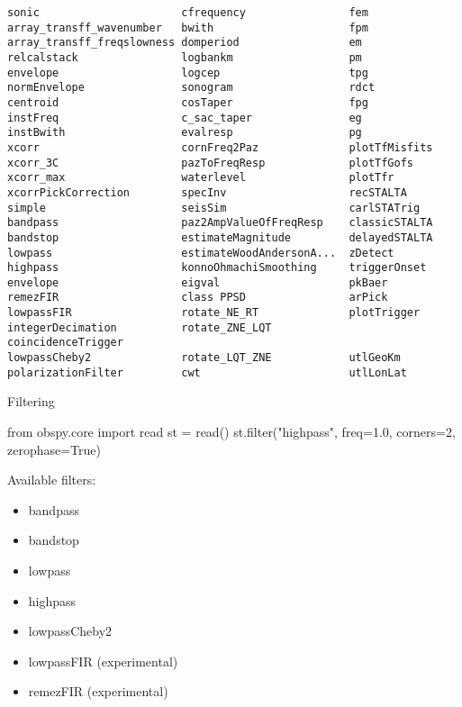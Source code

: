\begin{frame}{}

\footnotesize
\begin{verbatim}
sonic                      cfrequency                fem
array_transff_wavenumber   bwith                     fpm
array_transff_freqslowness domperiod                 em
relcalstack                logbankm                  pm
envelope                   logcep                    tpg
normEnvelope               sonogram                  rdct
centroid                   cosTaper                  fpg
instFreq                   c_sac_taper               eg
instBwith                  evalresp                  pg
xcorr                      cornFreq2Paz              plotTfMisfits
xcorr_3C                   pazToFreqResp             plotTfGofs
xcorr_max                  waterlevel                plotTfr
xcorrPickCorrection        specInv                   recSTALTA
simple                     seisSim                   carlSTATrig
bandpass                   paz2AmpValueOfFreqResp    classicSTALTA
bandstop                   estimateMagnitude         delayedSTALTA
lowpass                    estimateWoodAndersonA...  zDetect
highpass                   konnoOhmachiSmoothing     triggerOnset
envelope                   eigval                    pkBaer
remezFIR                   class PPSD                arPick
lowpassFIR                 rotate_NE_RT              plotTrigger
integerDecimation          rotate_ZNE_LQT            coincidenceTrigger
lowpassCheby2              rotate_LQT_ZNE            utlGeoKm
polarizationFilter         cwt                       utlLonLat
\end{verbatim}
\end{frame}

\begin{frame}{Filtering}

\begin{myColorBox}{0.95}{}
\begin{python}
from obspy.core import read
st = read()
st.filter("highpass", freq=1.0, corners=2, zerophase=True)
\end{python}
\end{myColorBox}

Available filters:
\begin{itemize}
    \item bandpass
    \item bandstop
    \item lowpass
    \item highpass
    \item lowpassCheby2
    \item lowpassFIR (experimental)
    \item remezFIR (experimental)
\end{itemize}



\end{frame}


